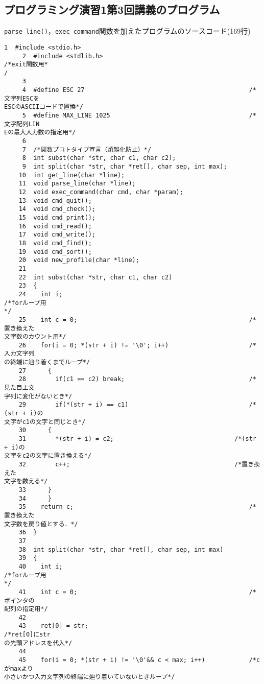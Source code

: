 \subsection{プログラミング演習1第3回講義のプログラム}\label{func3}
\verb|parse_line()|，\verb|exec_command|関数を加えたプログラムのソースコード(169行)
\begin{Verbatim}[fontsize=\small, baselinestretch=0.8]
     1	#include <stdio.h>
     2	#include <stdlib.h>                                        /*exit関数用*
/
     3	
     4	#define ESC 27                                             /*文字列ESCを
ESCのASCIIコードで置換*/
     5	#define MAX_LINE 1025                                      /*文字配列LIN
Eの最大入力数の指定用*/
     6	
     7	/*関数プロトタイプ宣言（煩雑化防止）*/
     8	int subst(char *str, char c1, char c2);
     9	int split(char *str, char *ret[], char sep, int max);
    10	int get_line(char *line);
    11	void parse_line(char *line);
    12	void exec_command(char cmd, char *param);
    13	void cmd_quit();
    14	void cmd_check();
    15	void cmd_print();
    16	void cmd_read();
    17	void cmd_write();
    18	void cmd_find();
    19	void cmd_sort();
    20	void new_profile(char *line);
    21	
    22	int subst(char *str, char c1, char c2)
    23	{
    24	  int i;                                                   /*forループ用
*/
    25	  int c = 0;                                               /*置き換えた
文字数のカウント用*/
    26	  for(i = 0; *(str + i) != '\0'; i++)                      /*入力文字列
の終端に辿り着くまでループ*/
    27	    {
    28	      if(c1 == c2) break;                                  /*見た目上文
字列に変化がないとき*/
    29	      if(*(str + i) == c1)                                 /*(str + i)の
文字がc1の文字と同じとき*/
    30		{
    31		  *(str + i) = c2;                                 /*(str + i)の
文字をc2の文字に置き換える*/
    32		  c++;                                             /*置き換えた
文字を数える*/
    33		}
    34	    }
    35	  return c;                                                /*置き換えた
文字数を戻り値とする．*/
    36	}
    37	
    38	int split(char *str, char *ret[], char sep, int max)
    39	{
    40	  int i;                                                   /*forループ用
*/
    41	  int c = 0;                                               /*ポインタの
配列の指定用*/
    42	
    43	  ret[0] = str;                                            /*ret[0]にstr
の先頭アドレスを代入*/
    44	
    45	  for(i = 0; *(str + i) != '\0'&& c < max; i++)            /*cがmaxより
小さいかつ入力文字列の終端に辿り着いていないときループ*/

\end{Verbatim}
